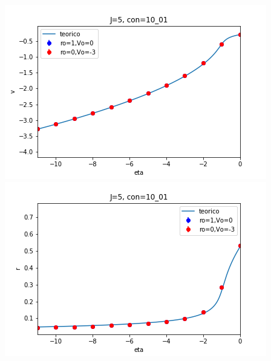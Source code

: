 \documentclass[a4paper]{article}
\begin{document}
\includegraphics[scale=0.7]{v_vs_eta_J5_mod10_01.png}\\
\includegraphics[scale=0.7]{r_vs_eta_J5_mod10_01.png}\\
\end{document}
